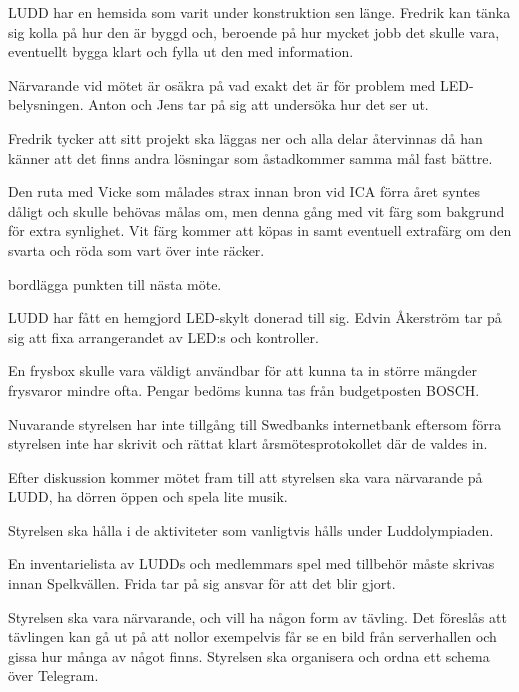 \documentclass{protokoll}
\begin{document}
LUDD har en hemsida som varit under konstruktion sen länge. Fredrik kan tänka sig kolla på hur den är byggd och, beroende på hur mycket jobb det skulle vara, eventuellt bygga klart och fylla ut den med information.

Närvarande vid mötet är osäkra på vad exakt det är för problem med LED-belysningen. 
Anton och Jens tar på sig att undersöka hur det ser ut. 


Fredrik tycker att sitt projekt ska läggas ner och alla delar återvinnas då han känner att det finns andra lösningar som åstadkommer samma mål fast bättre.

Den ruta med Vicke som målades strax innan bron vid ICA förra året syntes dåligt och skulle behövas målas om, men denna gång med vit färg som bakgrund för extra synlighet. 
Vit färg kommer att köpas in samt eventuell extrafärg om den svarta och röda som vart över inte räcker. 

\begin{beslut}
    \att bordlägga punkten till nästa möte.
\end{beslut}

LUDD har fått en hemgjord LED-skylt donerad till sig.  
Edvin Åkerström tar på sig att fixa arrangerandet av LED:s och kontroller.

En frysbox skulle vara väldigt användbar för att kunna ta in större mängder frysvaror mindre ofta. Pengar bedöms kunna tas från budgetposten BOSCH. 

Nuvarande styrelsen har inte tillgång till Swedbanks internetbank eftersom förra styrelsen inte har skrivit och rättat klart årsmötesprotokollet där de valdes in.

Efter diskussion kommer mötet fram till att styrelsen ska vara närvarande på LUDD, ha dörren öppen och spela lite musik.

Styrelsen ska hålla i de aktiviteter som vanligtvis hålls under Luddolympiaden. 

En inventarielista av LUDDs och medlemmars spel med tillbehör måste skrivas innan Spelkvällen.
Frida tar på sig ansvar för att det blir gjort. 

Styrelsen ska vara närvarande, och vill ha någon form av tävling. Det föreslås att tävlingen kan gå ut på att nollor exempelvis får se en bild från serverhallen och gissa hur många av något finns. 
Styrelsen ska organisera och ordna ett schema över Telegram. 
\end{document}

